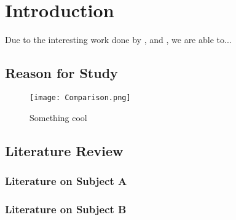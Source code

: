\chapter{Introduction}
\label{ch:Introduction}

Due to the interesting work done by \cite{ABDELFETTAH20181}, and \cite{SCARLAT20151269}, we are able to...

\section{Reason for Study}

\lipsum[1]

\begin{figure}
	\centering
	\texttt{[image: Comparison.png]}
	\caption{Something cool}
	\label{fig:cool figure}
\end{figure}

\section{Literature Review}

\lipsum[1]

\subsection{Literature on Subject A}

\lipsum[1]

\subsection{Literature on Subject B}
